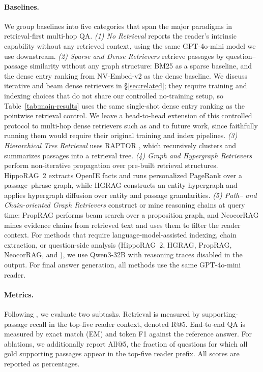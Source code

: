 \paragraph{Baselines.}
We group baselines into five categories that span the major paradigms
in retrieval-first multi-hop QA. \emph{(1) No Retrieval} reports the
reader's intrinsic capability without any retrieved context, using the
same GPT-4o-mini model we use downstream. \emph{(2) Sparse and Dense
Retrievers} retrieve passages by question--passage similarity without
any graph structure: BM25 \citep{robertson2009bm25} as a sparse
baseline, and the dense entry ranking from
NV-Embed-v2 \citep{lee2025nvembed} as the dense
baseline. We discuss iterative and beam dense retrievers in
\S\ref{sec:related}; they require training and indexing choices that
do not share our controlled no-training setup, so Table~\ref{tab:main-results}
uses the same single-shot dense entry ranking as the pointwise
retrieval control. We leave a head-to-head extension of this
controlled protocol to multi-hop dense retrievers such as
\citet{xiong2021mdr} and \citet{zhao2021beamdr} to future work, since
faithfully running them would require their original training and
index pipelines. \emph{(3) Hierarchical Tree Retrieval} uses RAPTOR
\citep{sarthi2024raptor}, which recursively clusters and summarizes
passages into a retrieval tree. \emph{(4) Graph and Hypergraph Retrievers} perform
non-iterative propagation over pre-built retrieval structures.
HippoRAG~2 \citep{gutierrez2025hipporag} extracts OpenIE facts and runs
personalized PageRank over a passage--phrase graph, while HGRAG
\citep{hgrag2024} constructs an entity hypergraph and applies
hypergraph diffusion over entity and passage granularities. \emph{(5) Path-- and
Chain-oriented Graph Retrievers} construct or mine reasoning chains at
query time: PropRAG \citep{wang2025proprag} performs beam search over a
proposition graph, and NeocorRAG \citep{peng2026neocorrag} mines
evidence chains from retrieved text and uses them to filter the reader
context. For methods that require language-model-assisted indexing,
chain extraction, or question-side analysis (HippoRAG~2, HGRAG,
PropRAG, NeocorRAG, and \methodname{}), we use Qwen3-32B with reasoning
traces disabled in the output. For final answer generation, all
methods use the same GPT-4o-mini reader.

\paragraph{Metrics.}
Following \citet{gutierrez2025hipporag}, we evaluate two subtasks.
Retrieval is measured by supporting-passage recall in the top-five
reader context, denoted R@5. End-to-end QA is measured by exact match
(EM) and token F1 against the reference answer. For ablations, we
additionally report All@5, the fraction of questions for which all
gold supporting passages appear in the top-five reader prefix. All
scores are reported as percentages.

